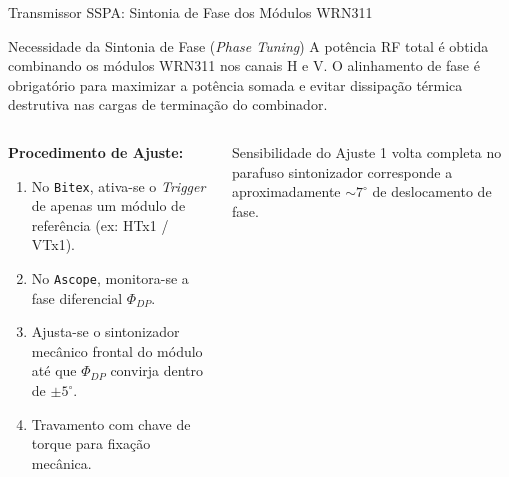 ﻿\documentclass[aspectratio=169]{beamer}
\begin{document}
\begin{frame}{Transmissor SSPA: Sintonia de Fase dos M{\'o}dulos WRN311}
    \begin{block}{Necessidade da Sintonia de Fase (\textit{Phase Tuning})}
        A pot{\^e}ncia RF total {\'e} obtida combinando os m{\'o}dulos WRN311 nos canais H e V. O alinhamento de fase {\'e} obrigat{\'o}rio para maximizar a pot{\^e}ncia somada e evitar dissipa{\c{c}}{\~a}o t{\'e}rmica destrutiva nas cargas de termina{\c{c}}{\~a}o do combinador.
    \end{block}

    \begin{columns}[T]
        \begin{column}{0.55\textwidth}
            \textbf{Procedimento de Ajuste:}
            \begin{enumerate}
                \item No \texttt{Bitex}, ativa-se o \textit{Trigger} de apenas um m{\'o}dulo de refer{\^e}ncia (ex: HTx1 / VTx1).
                \item No \texttt{Ascope}, monitora-se a fase diferencial $\Phi_{DP}$.
                \item Ajusta-se o sintonizador mec{\^a}nico frontal do m{\'o}dulo at{\'e} que $\Phi_{DP}$ convirja dentro de \textbf{$\pm 5^\circ$}.
                \item Travamento com chave de torque para fixa{\c{c}}{\~a}o mec{\^a}nica.
            \end{enumerate}
        \end{column}
        \begin{column}{0.4\textwidth}
            \begin{exampleblock}{Sensibilidade do Ajuste}
                1 volta completa no parafuso sintonizador corresponde a aproximadamente $\sim 7^\circ$ de deslocamento de fase.
            \end{exampleblock}
        \end{column}
    \end{columns}
\end{frame}
\end{document}
